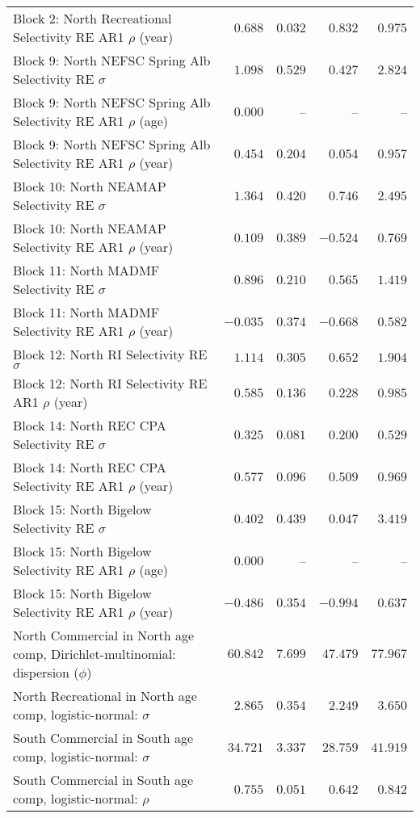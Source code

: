 \documentclass[
]{article}
\begin{document}
\begin{landscape}
\begin{longtable}[t]{lrrrr}
Block 2: North Recreational Selectivity RE AR1 $\rho$ (year) & $0.688$ & $0.032$ & $0.832$ & $0.975$\\
\addlinespace
Block 9: North NEFSC Spring Alb Selectivity RE $\sigma$ & $1.098$ & $0.529$ & $0.427$ & $2.824$\\
Block 9: North NEFSC Spring Alb Selectivity RE AR1 $\rho$ (age) & $0.000$ & -- & -- & --\\
Block 9: North NEFSC Spring Alb Selectivity RE AR1 $\rho$ (year) & $0.454$ & $0.204$ & $0.054$ & $0.957$\\
Block 10: North NEAMAP Selectivity RE $\sigma$ & $1.364$ & $0.420$ & $0.746$ & $2.495$\\
Block 10: North NEAMAP Selectivity RE AR1 $\rho$ (year) & $0.109$ & $0.389$ & $-0.524$ & $0.769$\\
\addlinespace
Block 11: North MADMF Selectivity RE $\sigma$ & $0.896$ & $0.210$ & $0.565$ & $1.419$\\
Block 11: North MADMF Selectivity RE AR1 $\rho$ (year) & $-0.035$ & $0.374$ & $-0.668$ & $0.582$\\
Block 12: North RI Selectivity RE $\sigma$ & $1.114$ & $0.305$ & $0.652$ & $1.904$\\
Block 12: North RI Selectivity RE AR1 $\rho$ (year) & $0.585$ & $0.136$ & $0.228$ & $0.985$\\
Block 14: North REC CPA Selectivity RE $\sigma$ & $0.325$ & $0.081$ & $0.200$ & $0.529$\\
\addlinespace
Block 14: North REC CPA Selectivity RE AR1 $\rho$ (year) & $0.577$ & $0.096$ & $0.509$ & $0.969$\\
Block 15: North Bigelow Selectivity RE $\sigma$ & $0.402$ & $0.439$ & $0.047$ & $3.419$\\
Block 15: North Bigelow Selectivity RE AR1 $\rho$ (age) & $0.000$ & -- & -- & --\\
Block 15: North Bigelow Selectivity RE AR1 $\rho$ (year) & $-0.486$ & $0.354$ & $-0.994$ & $0.637$\\
North Commercial in North age comp, Dirichlet-multinomial: dispersion ($\phi$) & $60.842$ & $7.699$ & $47.479$ & $77.967$\\
\addlinespace
North Recreational in North age comp, logistic-normal: $\sigma$ & $2.865$ & $0.354$ & $2.249$ & $3.650$\\
South Commercial in South age comp, logistic-normal: $\sigma$ & $34.721$ & $3.337$ & $28.759$ & $41.919$\\
South Commercial in South age comp, logistic-normal: $\rho$ & $0.755$ & $0.051$ & $0.642$ & $0.842$\\

\end{longtable}
\end{landscape}
\end{document}
